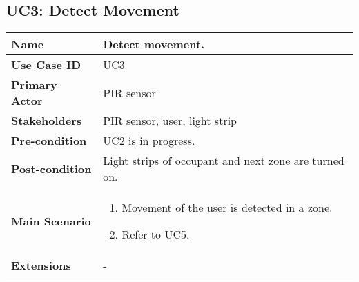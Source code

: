 \subsection{UC3: Detect Movement}
    \begin{tabular}{|p{}||p{}|}
        \hline
        \textbf{Name} & Detect movement. \\
        \hline
        \textbf{Use Case ID} & UC3 \\
        \hline
        \textbf{Primary Actor} & PIR sensor \\
        \hline
        \textbf{Stakeholders} & PIR sensor, user, light strip \\
        \hline
        \textbf{Pre-condition} & UC2 is in progress. \\
        \hline
        \textbf{Post-condition} & Light strips of occupant and next zone are turned on. \\
        \hline
        \textbf{Main Scenario} & 
            \begin{enumerate}
                \item Movement of the user is detected in a zone.
                \item Refer to UC5.
            \end{enumerate}
            \\
        \hline
        \textbf{Extensions} & - \\
        \hline
    \end{tabular}
    

